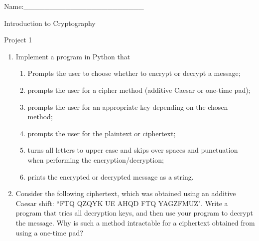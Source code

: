 \documentclass[12pt]{amsart}
\theoremstyle{definition}
\theoremstyle{remark}
\numberwithin{equation}{section}
\begin{document}
\begin{flushright}
Name:\_\_\_\_\_\_\_\_\_\_\_\_\_\_\_\_\_\_\_\_\_\_\_
\end{flushright}
\vspace{10pt}
\begin{center}
Introduction to Cryptography

Project 1
\end{center}



\begin{enumerate}
\item Implement a program in Python that 
\begin{enumerate}
\item Prompts the user to choose whether to encrypt or decrypt a message;
\item prompts the user for a cipher method (additive Caesar or one-time pad);
\item prompts the user for an appropriate key depending on the chosen method;
\item prompts the user for the plaintext or ciphertext;
\item turns all letters to upper case and skips over spaces and punctuation when performing the encryption/decryption;
\item prints the encrypted or decrypted message as a string.
\end{enumerate}
\item Consider the following ciphertext, which was obtained using an additive Caesar shift: ``FTQ QZQYK UE AHQD FTQ YAGZFMUZ". Write a program that tries all decryption keys, and then use your program to decrypt the message. Why is such a method intractable for a ciphertext obtained from using a one-time pad?
\end{enumerate}
\vfill
\end{document}

